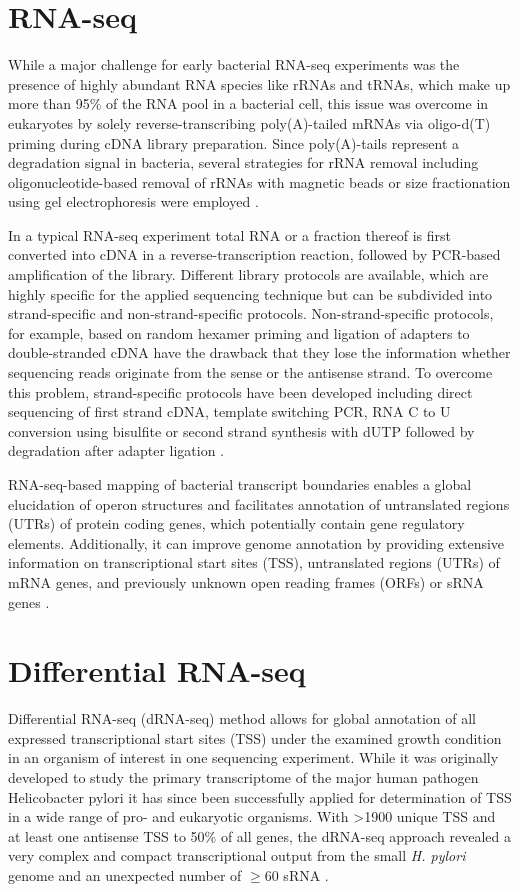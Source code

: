 \section{RNA-seq}
While a major challenge for early bacterial RNA-seq experiments was the presence of highly abundant RNA species like rRNAs 
and tRNAs, which make up more than 95\% of the RNA pool in a bacterial cell, this issue was overcome in eukaryotes by solely 
reverse-transcribing poly(A)-tailed mRNAs via oligo-d(T) priming during cDNA library preparation. Since poly(A)-tails represent 
a degradation signal in bacteria, several strategies for rRNA removal including oligonucleotide-based removal of rRNAs 
with magnetic beads or size fractionation using gel electrophoresis were employed  \cite{Bischler2015}.  

In a typical RNA-seq experiment total RNA or a fraction thereof is first converted into cDNA in a reverse-transcription 
reaction, followed by PCR-based amplification of the library. Different library protocols are available, which are highly 
specific for the applied sequencing technique but can be subdivided into strand-specific and non-strand-specific protocols. 
Non-strand-specific protocols, for example, based on random hexamer priming and ligation of adapters to double-stranded 
cDNA have the drawback that they lose the information whether sequencing reads originate from the sense or the antisense 
strand. To overcome this problem, strand-specific protocols have been developed including direct sequencing of first strand 
cDNA, template switching PCR, RNA C to U conversion using bisulfite or second strand synthesis with dUTP followed by degradation 
after adapter ligation \cite{Bischler2015,Sharma2014}.  

RNA-seq-based mapping of bacterial transcript boundaries enables a global elucidation of operon structures and facilitates 
annotation of untranslated regions (UTRs) of protein coding genes, which potentially contain gene regulatory elements. 
Additionally, it can improve genome annotation by providing extensive information on transcriptional start sites (TSS), 
untranslated regions (UTRs) of mRNA genes, and previously unknown open reading frames (ORFs) or sRNA genes \cite{Sharma2014}. 

\section{Differential RNA-seq}
Differential RNA-seq (dRNA-seq) method allows for global annotation of all expressed transcriptional start sites (TSS) under 
the examined growth condition in an organism of interest in one sequencing experiment. While it was originally developed to 
study the primary transcriptome of the major human pathogen Helicobacter pylori it has since been successfully applied for 
determination of TSS in a wide range of pro- and eukaryotic organisms. With >1900 unique TSS and at least one antisense TSS 
to 50\% of all genes, the dRNA-seq approach revealed a very complex and compact transcriptional output from the small 
\textit{H. pylori} genome and an unexpected number of \(\ge\)60 sRNA  \cite{Schafee2017}.

